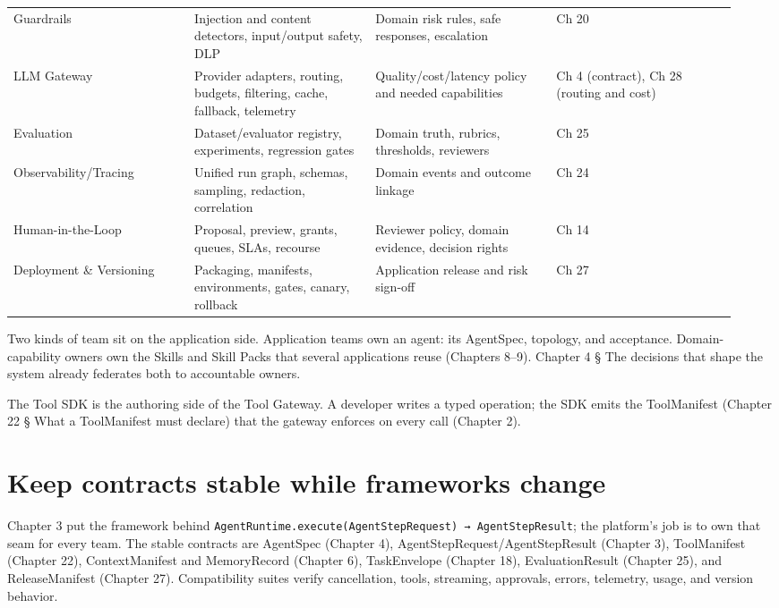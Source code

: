 \begin{longtable}{@{}Y{0.2350\linewidth}Y{0.2350\linewidth}Y{0.2350\linewidth}Y{0.2350\linewidth}@{}}
Guardrails & Injection and content detectors, input/output safety, DLP & Domain risk rules, safe responses, escalation & Ch 20 \\
LLM Gateway & Provider adapters, routing, budgets, filtering, cache, fallback, telemetry & Quality/cost/latency policy and needed capabilities & Ch 4 (contract), Ch 28 (routing and cost) \\
Evaluation & Dataset/evaluator registry, experiments, regression gates & Domain truth, rubrics, thresholds, reviewers & Ch 25 \\
Observability/Tracing & Unified run graph, schemas, sampling, redaction, correlation & Domain events and outcome linkage & Ch 24 \\
Human-in-the-Loop & Proposal, preview, grants, queues, SLAs, recourse & Reviewer policy, domain evidence, decision rights & Ch 14 \\
Deployment \& Versioning & Packaging, manifests, environments, gates, canary, rollback & Application release and risk sign-off & Ch 27 \\
\end{longtable}
\BookTableEnd

Two kinds of team sit on the application side. Application teams own an agent: its AgentSpec, topology, and acceptance. Domain-capability owners own the Skills and Skill Packs that several applications reuse (Chapters 8–9). Chapter 4 § The decisions that shape the system already federates both to accountable owners.\par

The Tool SDK is the authoring side of the Tool Gateway. A developer writes a typed operation; the SDK emits the ToolManifest (Chapter 22 § What a ToolManifest must declare) that the gateway enforces on every call (Chapter 2).\par

\section{Keep contracts stable while frameworks change}


Chapter 3 put the framework behind \lstinline[style=bookinline]!AgentRuntime.execute(AgentStepRequest) → AgentStepResult!; the platform's job is to own that seam for every team. The stable contracts are AgentSpec (Chapter 4), AgentStepRequest/AgentStepResult (Chapter 3), ToolManifest (Chapter 22), ContextManifest and MemoryRecord (Chapter 6), TaskEnvelope (Chapter 18), EvaluationResult (Chapter 25), and ReleaseManifest (Chapter 27). Compatibility suites verify cancellation, tools, streaming, approvals, errors, telemetry, usage, and version behavior.\par

